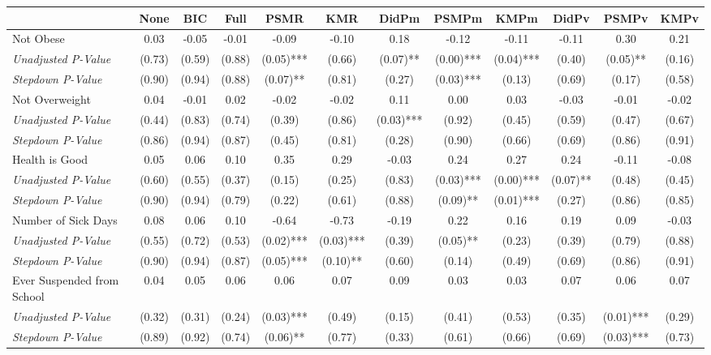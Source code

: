 \begin{tabular}{l c c c c c c c c c c c}
\toprule
 & None & BIC & Full & PSMR & KMR & DidPm & PSMPm & KMPm & DidPv & PSMPv & KMPv \\
\midrule
Not Obese & 0.03 & -0.05 & -0.01 & -0.09 & -0.10 & 0.18 & -0.12 & -0.11 & -0.11 & 0.30 & 0.21 \\
\quad \textit{Unadjusted P-Value} & (0.73) & (0.59) & (0.88) & (0.05)*** & (0.66) & (0.07)** & (0.00)*** & (0.04)*** & (0.40) & (0.05)** & (0.16) \\
\quad \textit{Stepdown P-Value} & (0.90) & (0.94) & (0.88) & (0.07)** & (0.81) & (0.27) & (0.03)*** & (0.13) & (0.69) & (0.17) & (0.58) \\
Not Overweight & 0.04 & -0.01 & 0.02 & -0.02 & -0.02 & 0.11 & 0.00 & 0.03 & -0.03 & -0.01 & -0.02 \\
\quad \textit{Unadjusted P-Value} & (0.44) & (0.83) & (0.74) & (0.39) & (0.86) & (0.03)*** & (0.92) & (0.45) & (0.59) & (0.47) & (0.67) \\
\quad \textit{Stepdown P-Value} & (0.86) & (0.94) & (0.87) & (0.45) & (0.81) & (0.28) & (0.90) & (0.66) & (0.69) & (0.86) & (0.91) \\
Health is Good & 0.05 & 0.06 & 0.10 & 0.35 & 0.29 & -0.03 & 0.24 & 0.27 & 0.24 & -0.11 & -0.08 \\
\quad \textit{Unadjusted P-Value} & (0.60) & (0.55) & (0.37) & (0.15) & (0.25) & (0.83) & (0.03)*** & (0.00)*** & (0.07)** & (0.48) & (0.45) \\
\quad \textit{Stepdown P-Value} & (0.90) & (0.94) & (0.79) & (0.22) & (0.61) & (0.88) & (0.09)** & (0.01)*** & (0.27) & (0.86) & (0.85) \\
Number of Sick Days & 0.08 & 0.06 & 0.10 & -0.64 & -0.73 & -0.19 & 0.22 & 0.16 & 0.19 & 0.09 & -0.03 \\
\quad \textit{Unadjusted P-Value} & (0.55) & (0.72) & (0.53) & (0.02)*** & (0.03)*** & (0.39) & (0.05)** & (0.23) & (0.39) & (0.79) & (0.88) \\
\quad \textit{Stepdown P-Value} & (0.90) & (0.94) & (0.87) & (0.05)*** & (0.10)** & (0.60) & (0.14) & (0.49) & (0.69) & (0.86) & (0.91) \\
Ever Suspended from School & 0.04 & 0.05 & 0.06 & 0.06 & 0.07 & 0.09 & 0.03 & 0.03 & 0.07 & 0.06 & 0.07 \\
\quad \textit{Unadjusted P-Value} & (0.32) & (0.31) & (0.24) & (0.03)*** & (0.49) & (0.15) & (0.41) & (0.53) & (0.35) & (0.01)*** & (0.29) \\
\quad \textit{Stepdown P-Value} & (0.89) & (0.92) & (0.74) & (0.06)** & (0.77) & (0.33) & (0.61) & (0.66) & (0.69) & (0.03)*** & (0.73) \\
\bottomrule
\end{tabular}
